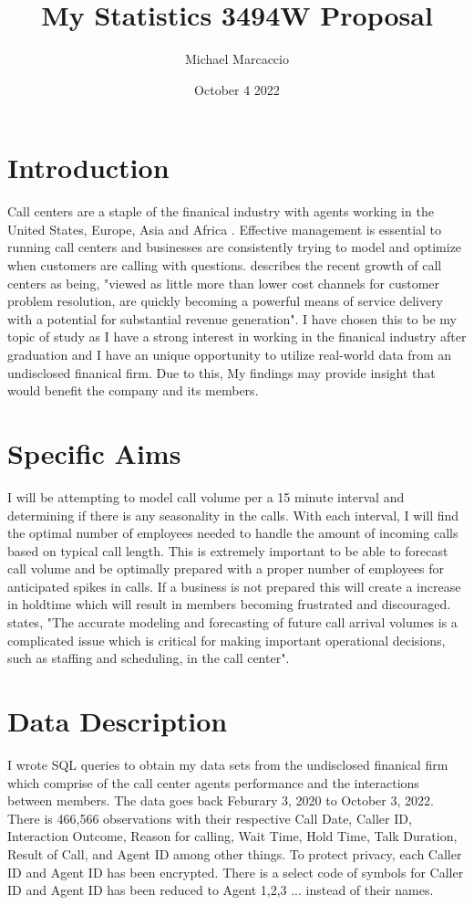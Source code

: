 \documentclass[12pt]{article}
\title{My Statistics 3494W Proposal}
\author{Michael  Marcaccio}
\date{October 4 2022}
\begin{document}
\maketitle

\section*{Introduction}
Call centers are a staple of the finanical industry with agents working in the United States, Europe, Asia and Africa \citep{ibrahim2016modeling}. 
Effective management is essential to running call centers and businesses are consistently trying to model and optimize when customers are calling with questions. 
\citet*{evensen1999effective} describes the recent growth of call centers as being, "viewed as little more than lower cost channels for customer
problem resolution, are quickly becoming a powerful means of service delivery with a potential for substantial revenue generation".
I have chosen this to be my topic of study as I have a strong interest in working in the finanical industry after graduation and I have an unique opportunity to utilize real-world data from an undisclosed
finanical firm. Due to this, My findings may provide insight that would benefit the company and its members.

\section*{Specific Aims}
I will be attempting to model call volume per a 15 minute interval and determining if there is any seasonality in the calls. With each interval,
I will find the optimal number of employees needed to handle the amount of incoming calls based on typical call length. This is extremely important
to be able to forecast call volume and be optimally prepared with a proper number of employees for anticipated spikes in calls. If a business is not prepared
this will create a increase in holdtime which will result in members becoming frustrated and discouraged. \citet*{ibrahim2016modeling} states, "The accurate modeling and forecasting of future call arrival volumes is a 
complicated issue which is critical for making important operational decisions, such as staffing and scheduling, in the call center".
    
\section*{Data Description}
I wrote SQL queries to obtain my data sets from the undisclosed finanical firm which comprise of the call center agents performance and the interactions between members. 
The data goes back Feburary 3, 2020 to October 3, 2022. There is 466,566 observations with their respective Call Date, Caller ID, Interaction Outcome,
Reason for calling, Wait Time, Hold Time, Talk Duration, Result of Call, and Agent ID among other things. To protect privacy, each Caller ID
and Agent ID has been encrypted. There is a select code of symbols for Caller ID and Agent ID has been reduced to Agent 1,2,3 ... instead of 
their names.



\end{document}
